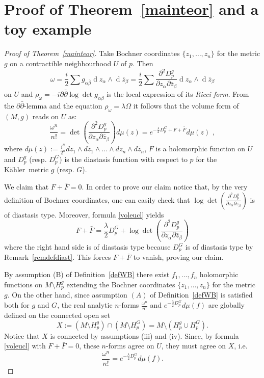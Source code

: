 \documentclass[12pt]{amsart}
\newcommand{\K}{K\"{a}hler}
\newcommand{\di}{{\operatorname{d}}}
\begin{document}
\section{Proof of Theorem~\ref{mainteor} and a toy example}\label{SecProofs}
\begin{proof}[Proof of Theorem~\ref{mainteor}]
Take Bochner coordinates $\{z_1,\dots ,z_n\}$ for the metric $g$ on a contractible  neighbourhood $U$ of $p$.
Then   
$$\omega =\frac{i}{2}\sum g_{\alpha\bar{\beta}}\di z_{\alpha}\wedge \di\bar{z}_{\beta}=\frac{i}{2}\sum\frac{\partial ^2 D^g_p}
{\partial z_{\alpha} \partial \bar z_{\beta}} \di z_{\alpha}\wedge \di\bar{z}_{\beta}$$ on $U$
and 
$\rho _{\omega}=-i\partial \bar{\partial}\log \det g_{{\alpha}\bar{\beta}}$ is the local expression of its \emph{Ricci form}.
From the $\partial\bar\partial$-lemma and the equation $\rho_\omega=\lambda\Omega$ it follows that the volume form of $(M, g)$ reads on $U$ as:
\begin{equation}\label{voleuclbo}
\frac{\omega^n}{n!}=
\det \left(\frac{\partial ^2 D^g_p}
{\partial z_{\alpha} \partial \bar z_{\beta}}\right)
d\mu(z)=
e^{-\frac{\lambda}{2}D^G_p+F+\bar F}
d\mu(z)\, \, ,
\end{equation}
where  $d\mu(z):=\frac{i^n}{2^n}dz_1\wedge d\bar z_1\wedge\dots\wedge 
dz_n\wedge d\bar z_n$, 
 $F$ is a holomorphic
function on $U$
and $D_p^g$ 
(resp. $D^G_p$)
is the diastasis function with respect to $p$
for the \K\ metric $g$ (resp. $G$).
 
We claim that
$F+\bar F=0$.
In order to prove our  claim notice 
that, by  the very definition
of Bochner coordinates, one can easily
check that 
$\log\det (\frac{\partial ^2 D^g_p}
{\partial z_{\alpha} \partial \bar z_{\beta}})$
is of diastasis type.
Moreover,  formula  \eqref{voleucl} 
yields
$$F + \bar F=
\frac{\lambda}{2} D^G_p+
\log\det (\frac{\partial ^2 D^g_p}
{\partial z_{\alpha} \partial \bar z_{\beta}})$$
where the  right hand side is 
of diastasis type because $D^G_p$ is of diastasis type
by Remark~\ref{remdefdiast}. This forces
$F + \bar F$ to vanish,
proving our claim.

By assumption (B) of Definition~\ref{defWB}  there exist  $f_1, \dots ,f_n$  holomorphic functions on $M\setminus H_p^g$ extending 
the Bochner coordinates $\{z_1, \dots ,z_n\}$ for the metric $g$.
On the other hand, since assumption $(A)$ of Definition~\ref{defWB}    is satisfied both for $g$ and $G$,
the real analytic  $n$-forms 
$\frac{\omega^n}{n!}$
and
$e^{-\frac{\lambda}{2}D^G_{p}}
d\mu (f)$ 
are globally defined on the connected   open set 
$$X:=(M\setminus H_p^g)\cap (M\setminus H_p^G)=M\setminus (H_p^g\cup H_p^G).$$
Notice that $X$ is connected by assumptions (iii) and (iv).
Since, by 
formula \eqref{voleucl} with $F+\bar F=0$, these $n$-forms agree on $U$,
they
must agree
on $X$, i.e.
\begin{equation}\label{voleucl3}
\frac{\omega^n}{n!}=
e^{-\frac{\lambda}{2}D^G_p}
d\mu (f).
\end{equation}


\end{proof}
\end{document}
